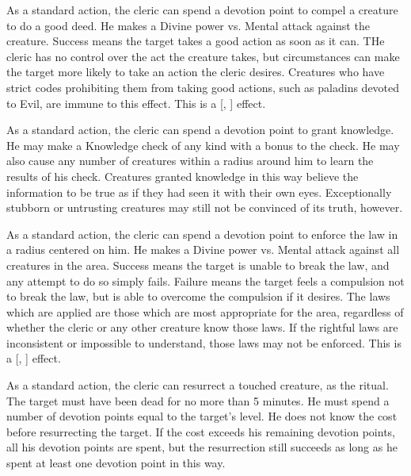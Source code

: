             As a standard action, the cleric can spend a devotion point to compel a creature to do a good deed.
            He makes a Divine power vs. Mental attack against the creature.
            Success means the target takes a good action as soon as it can.
            THe cleric has no control over the act the creature takes, but circumstances can make the target more likely to take an action the cleric desires.
            Creatures who have strict codes prohibiting them from taking good actions, such as paladins devoted to Evil, are immune to this effect.
            This is a [, ] effect.

            As a standard action, the cleric can spend a devotion point to grant knowledge.
            He may make a Knowledge check of any kind with a  bonus to the check.
            He may also cause any number of creatures within a \arealarge radius around him to learn the results of his check.
            Creatures granted knowledge in this way believe the information to be true as if they had seen it with their own eyes.
            Exceptionally stubborn or untrusting creatures may still not be convinced of its truth, however.

            As a standard action, the cleric can spend a devotion point to enforce the law in a \arealarge radius  centered on him.
            He makes a Divine power vs. Mental attack against all creatures in the area.
            Success means the target is unable to break the law, and any attempt to do so simply fails.
            Failure means the target feels a compulsion not to break the law, but is able to overcome the compulsion if it desires.
            The laws which are applied are those which are most appropriate for the area, regardless of whether the cleric or any other creature know those laws.
            If the rightful laws are inconsistent or impossible to understand, those laws may not be enforced.
            This is a [, ] effect.

            As a standard action, the cleric can resurrect a touched creature, as the  ritual.
            The target must have been dead for no more than 5 minutes.
            He must spend a number of devotion points equal to the target's level.
            He does not know the cost before resurrecting the target.
            If the cost exceeds his remaining devotion points, all his devotion points are spent, but the resurrection still succeeds as long as he spent at least one devotion point in this way.

